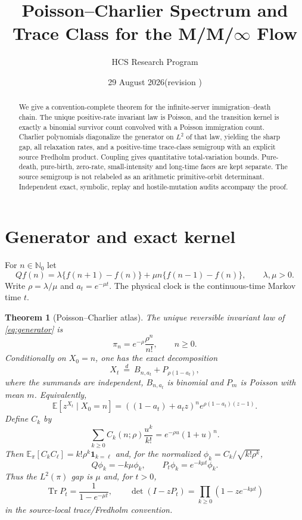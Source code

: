 \documentclass[11pt]{article}
\title{Poisson--Charlier Spectrum and Trace Class for the M/M/$\infty$ Flow}
\author{HCS Research Program}
\date{29 August 2026\quad (revision \CRevisionRound)}
\newtheorem{theorem}{Theorem}
\begin{document}
\maketitle

\begin{abstract}
We give a convention-complete theorem for the infinite-server
immigration--death chain.  The unique positive-rate invariant law is Poisson,
and the transition kernel is exactly a binomial survivor count convolved with
a Poisson immigration count.  Charlier polynomials diagonalize the generator
on $L^2$ of that law, yielding the sharp gap, all relaxation rates, and a
positive-time trace-class semigroup with an explicit source Fredholm product.
Coupling gives quantitative total-variation bounds.  Pure-death, pure-birth,
zero-rate, small-intensity and long-time faces are kept separate.  The source
semigroup is not relabeled as an arithmetic primitive-orbit determinant.
Independent exact, symbolic, replay and hostile-mutation audits accompany the
proof.
\end{abstract}

\section{Generator and exact kernel}
For $n\in\mathbb N_0$ let
\begin{equation}
 Qf(n)=\lambda\{f(n+1)-f(n)\}+\mu n\{f(n-1)-f(n)\},\qquad \lambda,\mu>0.
 \label{eq:generator}
\end{equation}
Write $\rho=\lambda/\mu$ and $a_t=e^{-\mu t}$.  The physical clock is the
continuous-time Markov time $t$.

\begin{theorem}[Poisson--Charlier atlas]\label{thm:atlas}
The unique reversible invariant law of \eqref{eq:generator} is
\[
 \pi_n=e^{-\rho}\frac{\rho^n}{n!},\qquad n\ge0.
\]
Conditionally on $X_0=n$, one has the exact decomposition
\[
 X_t\ \stackrel{d}{=}\ B_{n,a_t}+P_{\rho(1-a_t)},
 \tag{2}
\]
where the summands are independent, $B_{n,a_t}$ is binomial and $P_m$ is
Poisson with mean $m$.  Equivalently,
\[
 \mathbb E[z^{X_t}\mid X_0=n]
 =((1-a_t)+a_tz)^n e^{\rho(1-a_t)(z-1)}. \tag{3}
\]
Define $C_k$ by
\[
 \sum_{k\ge0}C_k(n;\rho)\frac{u^k}{k!}=e^{-\rho u}(1+u)^n . \tag{4}
\]
Then $\mathbb E_\pi[C_kC_\ell]=k!\rho^k\mathbf1_{k=\ell}$ and, for
the normalized $\phi_k=C_k/\sqrt{k!\rho^k}$,
\[
 Q\phi_k=-k\mu\phi_k,\qquad P_t\phi_k=e^{-k\mu t}\phi_k . \tag{5}
\]
Thus the $L^2(\pi)$ gap is $\mu$ and, for $t>0$,
\[
 \operatorname{Tr}P_t=\frac1{1-e^{-\mu t}},\qquad
 \det(I-zP_t)=\prod_{k\ge0}(1-ze^{-k\mu t})
 \tag{6}
\]
in the source-local trace/Fredholm convention.
\end{theorem}
\end{document}
